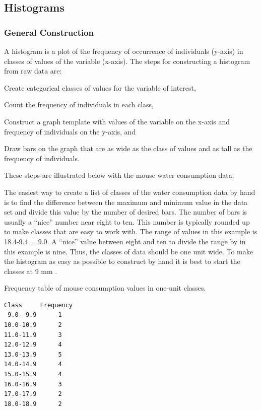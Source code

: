 \documentclass[10pt,openany]{book}\usepackage[]{graphicx}\usepackage[]{color}
\begin{document}
\subsection{Histograms}
\vspace{-8pt}
\subsubsection{General Construction}
\vspace{-8pt}
A histogram is a plot of the frequency of occurrence of individuals (y-axis) in classes of values of the variable (x-axis).  The steps for constructing a histogram from raw data are:
\vspace{-6pt}
\begin{Enumerate}
  \item Create categorical classes of values for the variable of interest,
  \item Count the frequency of individuals in each class,
  \item Construct a graph template with values of the variable on the x-axis and frequency of individuals on the y-axis, and
  \item Draw bars on the graph that are as wide as the class of values and as tall as the frequency of individuals.
\end{Enumerate}
These steps are illustrated below with the mouse water consumption data.

The easiest way to create a list of classes of the water consumption data by hand is to find the difference between the maximum and minimum value in the data set and divide this value by the number of desired bars.  The number of bars is usually a ``nice'' number near eight to ten.  This number is typically rounded up to make classes that are easy to work with.  The range of values in this example is 18.4-9.4 = 9.0.  A ``nice'' value between eight and ten to divide the range by in this example is nine.  Thus, the classes of data should be one unit wide.  To make the histogram as easy as possible to construct by hand it is best to start the classes at 9 mm .

\begin{table}[htbp]
  \caption{Frequency table of mouse consumption values in one-unit classes.}
  \label{tab:MouseFreqTable}
    \begin{Verbatim}[xleftmargin=5mm]
Class     Frequency
 9.0- 9.9      1
10.0-10.9      2
11.0-11.9      3
12.0-12.9      4
13.0-13.9      5
14.0-14.9      4
15.0-15.9      4
16.0-16.9      3
17.0-17.9      2
18.0-18.9      2
    \end{Verbatim}
\end{table}
\end{document}
